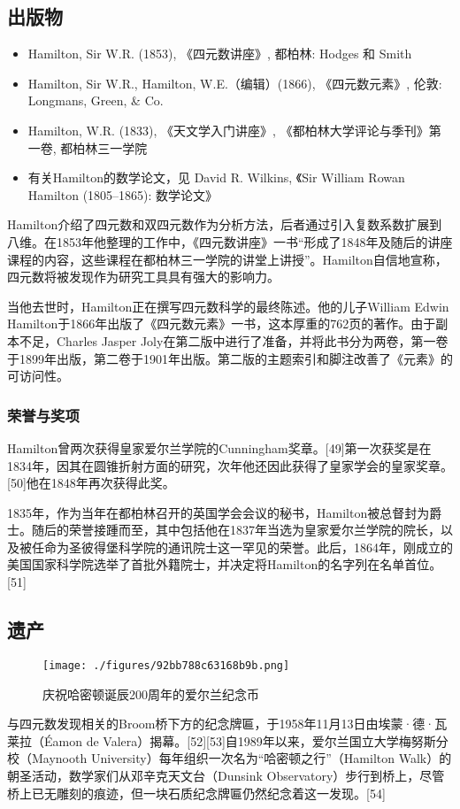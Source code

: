 \subsection{出版物} 
\begin{itemize}
\item Hamilton, Sir W.R. (1853), 《四元数讲座》, 都柏林: Hodges 和 Smith  
\item Hamilton, Sir W.R., Hamilton, W.E.（编辑）(1866), 《四元数元素》, 伦敦: Longmans, Green, & Co.  
\item Hamilton, W.R. (1833), 《天文学入门讲座》, 《都柏林大学评论与季刊》第一卷, 都柏林三一学院  
\item 有关Hamilton的数学论文，见 David R. Wilkins, 《Sir William Rowan Hamilton (1805–1865): 数学论文》 
\end{itemize} 

Hamilton介绍了四元数和双四元数作为分析方法，后者通过引入复数系数扩展到八维。在1853年他整理的工作中，《四元数讲座》一书“形成了1848年及随后的讲座课程的内容，这些课程在都柏林三一学院的讲堂上讲授”。Hamilton自信地宣称，四元数将被发现作为研究工具具有强大的影响力。

当他去世时，Hamilton正在撰写四元数科学的最终陈述。他的儿子William Edwin Hamilton于1866年出版了《四元数元素》一书，这本厚重的762页的著作。由于副本不足，Charles Jasper Joly在第二版中进行了准备，并将此书分为两卷，第一卷于1899年出版，第二卷于1901年出版。第二版的主题索引和脚注改善了《元素》的可访问性。
\subsubsection{荣誉与奖项}  
Hamilton曾两次获得皇家爱尔兰学院的Cunningham奖章。[49]第一次获奖是在1834年，因其在圆锥折射方面的研究，次年他还因此获得了皇家学会的皇家奖章。[50]他在1848年再次获得此奖。

1835年，作为当年在都柏林召开的英国学会会议的秘书，Hamilton被总督封为爵士。随后的荣誉接踵而至，其中包括他在1837年当选为皇家爱尔兰学院的院长，以及被任命为圣彼得堡科学院的通讯院士这一罕见的荣誉。此后，1864年，刚成立的美国国家科学院选举了首批外籍院士，并决定将Hamilton的名字列在名单首位。[51]
\subsection{遗产}
\begin{figure}[ht]
\centering
\texttt{[image: ./figures/92bb788c63168b9b.png]}
\caption{庆祝哈密顿诞辰200周年的爱尔兰纪念币} \label{fig_WLHMD_3}
\end{figure}
与四元数发现相关的Broom桥下方的纪念牌匾，于1958年11月13日由埃蒙·德·瓦莱拉（Éamon de Valera）揭幕。[52][53]自1989年以来，爱尔兰国立大学梅努斯分校（Maynooth University）每年组织一次名为“哈密顿之行”（Hamilton Walk）的朝圣活动，数学家们从邓辛克天文台（Dunsink Observatory）步行到桥上，尽管桥上已无雕刻的痕迹，但一块石质纪念牌匾仍然纪念着这一发现。[54]


